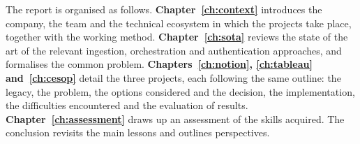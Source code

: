 The report is organised as follows. \textbf{Chapter~\ref{ch:context}} introduces the company, the team and the technical ecosystem in which the projects take place, together with the working method. \textbf{Chapter~\ref{ch:sota}} reviews the state of the art of the relevant ingestion, orchestration and authentication approaches, and formalises the common problem. \textbf{Chapters~\ref{ch:notion}, \ref{ch:tableau} and~\ref{ch:cesop}} detail the three projects, each following the same outline: the legacy, the problem, the options considered and the decision, the implementation, the difficulties encountered and the evaluation of results. \textbf{Chapter~\ref{ch:assessment}} draws up an assessment of the skills acquired. The conclusion revisits the main lessons and outlines perspectives.